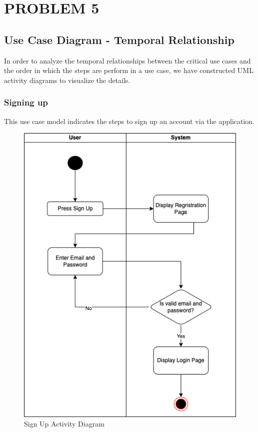 \newpage
\section{PROBLEM 5}
\subsection{Use Case Diagram - Temporal Relationship}
In order to analyze the temporal relationships between the critical use cases and the order in which the steps are perform in a use case, we have constructed UML activity diagrams to visualize the details.
\subsubsection{Signing up}
This use case model indicates the steps to sign up an account via the application.
\begin{figure}[H]
  \centering
  \includegraphics[scale = 0.60]{images/SignUpActivity.png}
  \caption{Sign Up Activity Diagram}
  \label{fig:Sign Up Activity Diagram}
\end{figure}
\newpage

